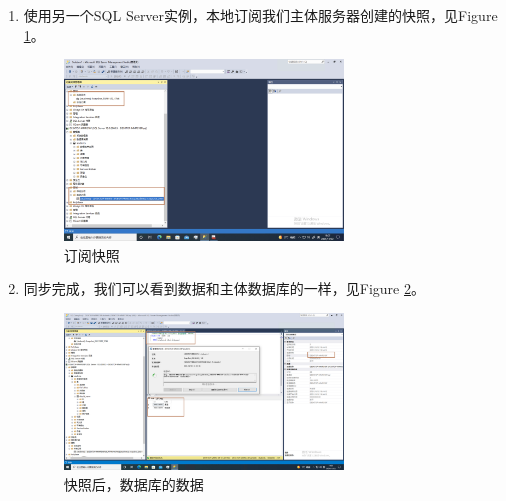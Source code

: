 \documentclass[onecolumn,oneside]{BUPTHomework}
\begin{document}
  \begin{enumerate}

    \item 使用另一个SQL Server实例，本地订阅我们主体服务器创建的快照，见Figure \ref{pic23}。
    
    \begin{figure}[h]
      \centering
      \includegraphics[width=0.70\textwidth]{image/pic23.png}
      \caption{订阅快照}
      \label{pic23}
    \end{figure}

    \item 同步完成，我们可以看到数据和主体数据库的一样，见Figure \ref{pic24}。
    
    \begin{figure}[h]
      \centering
      \includegraphics[width=0.70\textwidth]{image/pic24.png}
      \caption{快照后，数据库的数据}
      \label{pic24}
    \end{figure}
    
  \end{enumerate}
  
  \newpage
  
  
\end{document}
